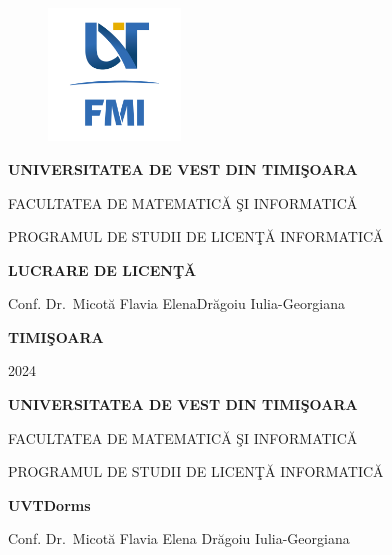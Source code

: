 \documentclass[12pt,a4paper]{report}
\theoremstyle{definition}
\theoremstyle{remark}
\begin{document}
\thispagestyle{empty}
\begin{center}
    \begin{figure}[H]
        \vspace{-20pt}
        \begin{center}
            \includegraphics[width=100pt]{resurse/FMI-03.png}
        \end{center}
    \end{figure}


    {\large{\bf UNIVERSITATEA DE VEST DIN TIMI\c SOARA

        FACULTATEA DE MATEMATIC\u A \c SI INFORMATIC\u A

        PROGRAMUL DE STUDII DE LICEN\c T\u A INFORMATICĂ  }}

    \vspace{120pt}
    {\huge {\bf LUCRARE DE LICEN\c T\u A}}

    \vspace{150pt}
\end{center}

{\large{}

\noindent Conf. Dr.\ Micotă Flavia Elena\hfill Dr\u agoiu  Iulia-Georgiana}

\vfill
\begin{center}
    {\bf TIMI\c SOARA

        2024}
\end{center}
\newpage
\thispagestyle{empty}
\begin{center}
    {\large{\bf UNIVERSITATEA DE VEST DIN TIMI\c SOARA

            FACULTATEA DE MATEMATIC\u A \c SI INFORMATIC\u A


            PROGRAMUL DE STUDII DE LICEN\c T\u A  INFORMATIC\u A  }}

    \vspace{120pt}
    {\huge {\bf UVTDorms}}

    \vspace{150pt}
\end{center}

{\large{}

\noindent Conf. Dr.\ Micot\u a Flavia Elena \hfill Dr\u agoiu Iulia-Georgiana}
\end{document}
